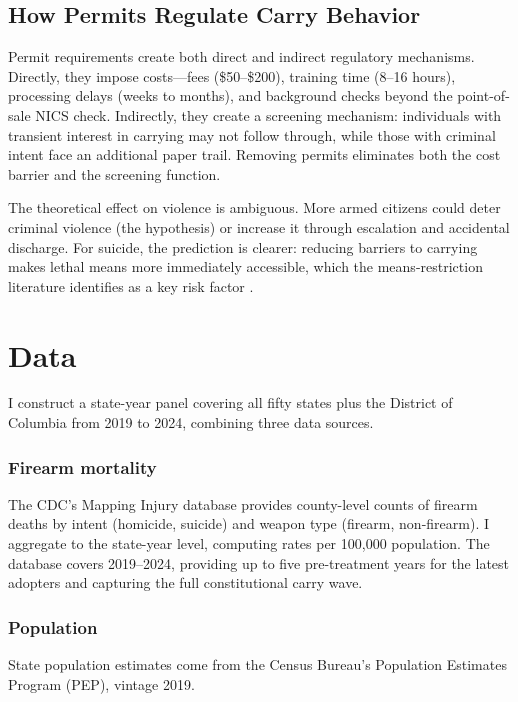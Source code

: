 \documentclass[12pt]{article}
\begin{document}
\subsection{How Permits Regulate Carry Behavior}

Permit requirements create both direct and indirect regulatory mechanisms. Directly, they impose costs---fees (\$50--\$200), training time (8--16 hours), processing delays (weeks to months), and background checks beyond the point-of-sale NICS check. Indirectly, they create a screening mechanism: individuals with transient interest in carrying may not follow through, while those with criminal intent face an additional paper trail. Removing permits eliminates both the cost barrier and the screening function.

The theoretical effect on violence is ambiguous. More armed citizens could deter criminal violence (the \citealt{lottmustard1997} hypothesis) or increase it through escalation and accidental discharge. For suicide, the prediction is clearer: reducing barriers to carrying makes lethal means more immediately accessible, which the means-restriction literature identifies as a key risk factor \citep{miller2007, edwards2024}.

\section{Data}
\label{sec:data}

I construct a state-year panel covering all fifty states plus the District of Columbia from 2019 to 2024, combining three data sources.

\subsubsection*{Firearm mortality} The CDC's Mapping Injury database provides county-level counts of firearm deaths by intent (homicide, suicide) and weapon type (firearm, non-firearm). I aggregate to the state-year level, computing rates per 100,000 population. The database covers 2019--2024, providing up to five pre-treatment years for the latest adopters and capturing the full constitutional carry wave.

\subsubsection*{Population} State population estimates come from the Census Bureau's Population Estimates Program (PEP), vintage 2019.
\end{document}
